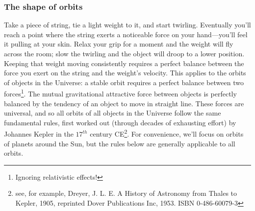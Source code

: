 \documentclass[amstex,12pt]{book}
\begin{document}
\subsubsection{The shape of orbits}
Take a piece of string, tie a light weight to it, and start twirling. Eventually you'll reach a point where the string exerts a noticeable force on your hand---you'll feel it pulling at your skin. Relax your grip for a moment and the weight will fly across the room; slow the twirling and the object will droop to a lower position. Keeping that weight moving consistently requires a perfect balance between the force you exert on the string and the weight's velocity. This applies to the orbits of objects in the Universe: a stable orbit requires a perfect balance between two forces\footnote{Ignoring relativistic effects!}. The mutual gravitational attractive force between objects is perfectly balanced by the tendency of an object to move in  straight line. These forces are universal, and so all orbits of all objects in the Universe follow the same fundamental rules, first worked out (through decades of exhausting effort) by Johannes Kepler in the $17^{th}$ century CE\footnote{see, for example, Dreyer, J. L. E. A History of Astronomy from Thales to Kepler, 1905, reprinted Dover Publications Inc, 1953. ISBN 0-486-60079-3}. For convenience, we'll focus on orbits of planets around the Sun, but the rules below are generally applicable to all orbits.\\ 
\end{document}
